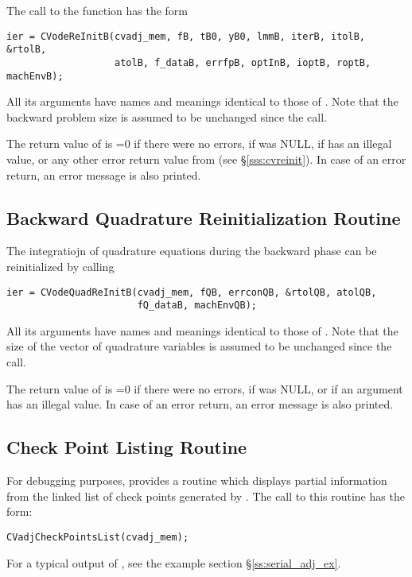 The call to the  function has the form
\begin{verbatim}
ier = CVodeReInitB(cvadj_mem, fB, tB0, yB0, lmmB, iterB, itolB, &rtolB, 
                   atolB, f_dataB, errfpB, optInB, ioptB, roptB, machEnvB);
\end{verbatim}
All its arguments  have names and meanings identical to those of .
Note that the backward problem size  is assumed to be unchanged since 
the  call.

The return value  of  is  
=0 if there were no errors,
 if  was NULL,
 if  has an illegal value,
or any other error return value from  (see \S\ref{sss:cvreinit}).
In case of an error return, an error message is also printed.  

\subsection{Backward Quadrature Reinitialization Routine}\label{sss:cvodequadreinitb}

The integratiojn of quadrature equations during the backward phase can be
reinitialized by calling
\begin{verbatim}
ier = CVodeQuadReInitB(cvadj_mem, fQB, errconQB, &rtolQB, atolQB, 
                       fQ_dataB, machEnvQB);
\end{verbatim}
All its arguments  have names and meanings identical to those of .
Note that the size of the vector of quadrature variables is assumed to 
be unchanged since the  call.

The return value  of  is  
=0 if there were no errors,
 if  was NULL, or
 if an argument has an illegal value.
In case of an error return, an error message is also printed.  

\subsection{Check Point Listing Routine}

For debugging purposes, {\cvodes} provides a routine  which
displays partial information from the linked list of check points generated by
. The call to this routine has the form:
\begin{verbatim}
CVadjCheckPointsList(cvadj_mem);
\end{verbatim}
For a typical output of , see the example section
\S\ref{ss:serial_adj_ex}.

